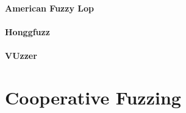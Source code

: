 \paragraph{American Fuzzy Lop}

\paragraph{Honggfuzz}

\paragraph{VUzzer}

\section{Cooperative Fuzzing}
\label{sec:coop}


